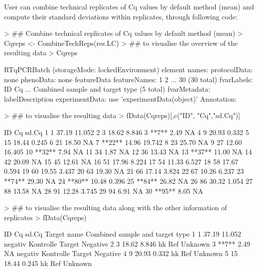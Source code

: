\documentclass[11pt]{article}
\begin{document}
User can combine technical replicates of Cq values by default method (mean) and compute their standard deviations
within replicates, through following code:
\begin{Schunk}
\begin{Sinput}
> ## Combine technical replicates of Cq values by default method (mean)
> Cqreps <- CombineTechReps(res.LC)
> ## to visualise the overview of the resulting data
> Cqreps 
\end{Sinput}
\begin{Soutput}
RTqPCRBatch (storageMode: lockedEnvironment)
  element names:  
protocolData: none
phenoData: none
featureData
  featureNames: 1 2 ... 30 (30 total)
  fvarLabels: ID Cq ... Combined sample and target type (5 total)
  fvarMetadata: labelDescription
experimentData: use 'experimentData(object)'
Annotation:  
\end{Soutput}
\begin{Sinput}
> ## to visualise the resulting data
> fData(Cqreps)[,c("ID", "Cq","sd.Cq")] 
\end{Sinput}
\begin{Soutput}
       ID    Cq  sd.Cq
1       1 37.19 11.052
2       3 18.62  8.846
3   **7**  2.49     NA
4       9 20.93  0.332
5      15 18.44  0.245
6      21 18.50     NA
7  **22** 14.96 19.742
8      23 25.70     NA
9      27 12.60 16.405
10 **32**  7.94     NA
11     34  1.87     NA
12     36 13.43     NA
13 **37** 11.00     NA
14     42 20.09     NA
15     45 12.61     NA
16     51 17.96  8.224
17     54 11.33  6.527
18     58 17.67  0.594
19     60 19.55  3.437
20     63 19.30     NA
21     66 17.14  3.824
22     67 10.26  6.237
23 **74** 29.30     NA
24 **80** 10.48  0.396
25 **84** 26.82     NA
26     86 30.32  1.054
27     88 13.58     NA
28     91 12.28  3.745
29     94  6.91     NA
30 **95**  8.05     NA
\end{Soutput}
\begin{Sinput}
> ## to visualise the resulting data along with the other information of replicates
> fData(Cqreps) 
\end{Sinput}
\begin{Soutput}
       ID    Cq  sd.Cq       Target name Combined sample and target type
1       1 37.19 11.052 negativ Kontrolle                 Target Negative
2       3 18.62  8.846                hk                     Ref Unknown
3   **7**  2.49     NA negativ Kontrolle                 Target Negative
4       9 20.93  0.332                hk                     Ref Unknown
5      15 18.44  0.245                hk                     Ref Unknown

\end{Soutput}
\end{Schunk}
\end{document}
